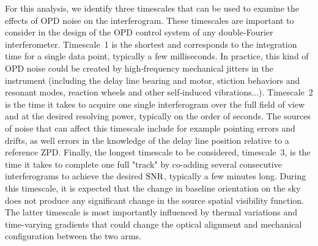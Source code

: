 For this analysis, we identify three timescales that can be used to examine the effects of OPD noise on the interferogram. These timescales are important to consider in the design of the OPD control system of any double-Fourier interferometer. Timescale~1 is the shortest and corresponds to the integration time for a single data point, typically a few milliseconds. In practice, this kind of OPD noise could be created by high-frequency mechanical jitters in the instrument (including the delay line bearing and motor, stiction behaviors and resonant modes, reaction wheels and other self-induced vibrations...). Timescale~2 is the time it takes to acquire one single interferogram over the full field of view and at the desired resolving power, typically on the order of seconds. The sources of noise that can affect this timescale include for example pointing errors and drifts, as well errors in the knowledge of the delay line position relative to
a reference ZPD. Finally, the longest timescale to be considered, timescale~3, is the time it takes to complete one full "track" by co-adding several consecutive interferograms to achieve the desired $\textrm{SNR}$, typically a few minutes long. During this timescale, it is expected that the change in baseline orientation on the sky does not produce any significant change in the source spatial visibility function. The latter timescale is most importantly influenced by thermal variations and time-varying gradients that could change the optical alignment and mechanical configuration between the two arms. 






